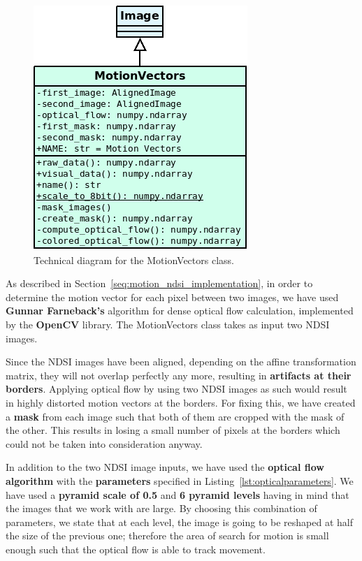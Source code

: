 \documentclass[12pt, a4paper]{report}
\begin{document}
	\begin{figure}[h!]
		\centering
		\includegraphics[scale=0.6]{../images/motion_vectors_diagram.png}
		\caption{Technical diagram for the MotionVectors class.}
		\label{fig:motion_vectors_diagram}
	\end{figure}

	\par As described in Section~\ref{seq:motion_ndsi_implementation}, in order to determine the motion vector for each pixel between two images, we have used \textbf{Gunnar Farneback's} algorithm for dense optical flow calculation, implemented by the \textbf{OpenCV} library. The MotionVectors class takes as input two NDSI images.
	
	\par Since the NDSI images have been aligned, depending on the affine transformation matrix, they will not overlap perfectly any more, resulting in \textbf{artifacts at their borders}. Applying optical flow by using two NDSI images as such would result in highly distorted motion vectors at the borders. For fixing this, we have created a \textbf{mask} from each image such that both of them are cropped with the mask of the other. This results in losing a small number of pixels at the borders which could not be taken into consideration anyway.
	
	\par In addition to the two NDSI image inputs, we have used the \textbf{optical flow algorithm} with the \textbf{parameters} specified in Listing~\ref{lst:opticalparameters}. We have used a \textbf{pyramid scale of 0.5} and \textbf{6 pyramid levels} having in mind that the images that we work with are large. By choosing this combination of parameters, we state that at each level, the image is going to be reshaped at half the size of the previous one; therefore the area of search for motion is small enough such that the optical flow is able to track movement.  
\end{document}
